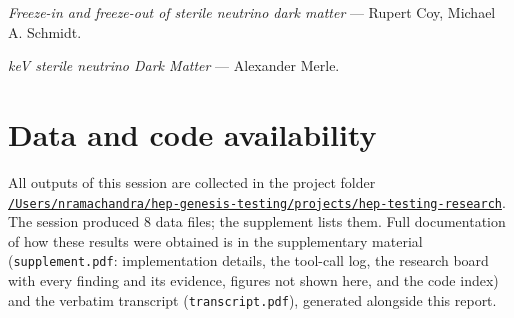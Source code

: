 \documentclass[11pt,a4paper]{article}
\begin{document}
\textit{Freeze-in and freeze-out of sterile neutrino dark matter} --- Rupert Coy, Michael A. Schmidt.

\textit{keV sterile neutrino Dark Matter} --- Alexander Merle.

\section*{Data and code availability}
All outputs of this session are collected in the project folder \href{file:///Users/nramachandra/hep-genesis-testing/projects/hep-testing-research}{\texttt{/\allowbreak{}Users/\allowbreak{}nramachandra/\allowbreak{}hep-genesis-testing/\allowbreak{}projects/\allowbreak{}hep-testing-research}}.
The session produced 8 data files; the supplement lists them.
Full documentation of how these results were obtained is in the supplementary material (\texttt{supplement.pdf}: implementation details, the tool-call log, the research board with every finding and its evidence, figures not shown here, and the code index) and the verbatim transcript (\texttt{transcript.pdf}), generated alongside this report.
\end{document}
